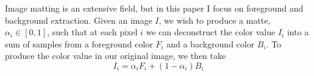 Image matting is an extensive field, but in this paper I focus on foreground and background extraction. Given an image $I$, we wish to produce a matte, $\alpha_{i}\in[0,1]$, such that at each pixel $i$ we can deconstruct the color value $I_{i}$ into a sum of samples from a foreground color $F_{i}$ and a background color $B_{i}$. To produce the color value in our original image, we then take
\[I_{i}=\alpha_{i}F_{i}+(1-\alpha_{i})B_{i}\]